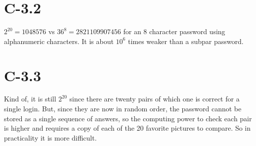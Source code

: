 \documentclass{article}
\begin{document}
  \section{C-3.2}
    $2^20=1048576$ vs $36^8=2821109907456$ for an 8 character password using alphanumeric characters. It is about $10^6$ times weaker than a subpar password.
  \section{C-3.3}
    Kind of, it is still $2^20$ since there are twenty pairs of which one is correct for a single login. But, since they are now in random order, the password cannot be stored as a single sequence of answers, so the computing power to check each pair is higher and requires a copy of each of the 20 favorite pictures to compare. So in practicality it is more difficult.
\end{document}
